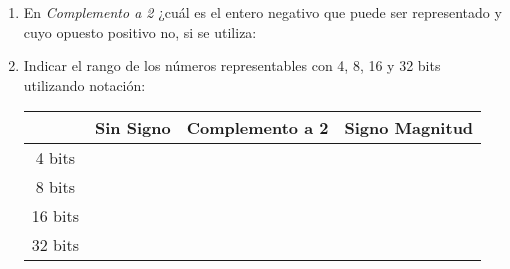 \documentclass[12pt]{article}
\begin{document}
\begin{enumerate}
\begin{center}
        \end{center}

    \item En \emph{Complemento a 2} ¿cuál es el entero negativo que puede ser
        representado y cuyo opuesto positivo no, si se utiliza:


    \item Indicar el rango de los números representables con 4, 8, 16 y 32
        bits utilizando notación:

        \begin{center}

            \begin{tabular}[t]{|c|c|c|c|}

            \cline{2-4}

            \multicolumn{1}{c|}{}& \textbf{Sin Signo} &
                \textbf{Complemento a 2} & \textbf{Signo Magnitud}\\

            \hline

                4 bits & \hspace{9em}~ &\hspace{9em}~&\hspace{9em}~\\

            \hline

            8 bits&&&\\

            \hline

            16 bits&&&\\

            \hline

            32 bits&&&\\

            \hline

            \end{tabular}

        \end{center}

\end{enumerate}
\end{document}
